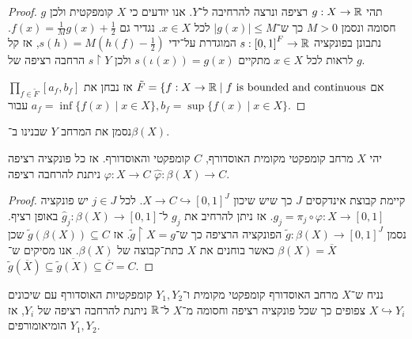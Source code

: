 \begin{proof}
	תהי $g : X \to \mathbb{R}$ רציפה ונרצה להרחיבה ל־$Y$.
	אנו יודעים כי $X$ קומפקטית ולכן $g$ חסומה ונסמן $M > 0$ כך ש־$|g(x)| \le M$ לכל $x \in X$.
	נגדיר גם $f(x) = \frac{1}{M} g(x) + \frac{1}{2}$.
	נתבונן בפונקציה $s : {[0, 1]}^F \to \mathbb{R}$ המוגדרת על־ידי $s(h) = M(h(f) - \frac{1}{2})$, אז קל לראות לכל $x \in X$ מתקיים $s(\iota(x)) = g(x)$ ולכן $s \restriction Y$ הרחבה רציפה של $g$.

	אם $\tilde{F} = \{ f : X \to \mathbb{R} \mid f \text{ is bounded and continuous}$ אז נבחן את $\prod_{f \in \tilde{F}} [a_f, b_f]$ עבור $a_f = \inf\{ f(x) \mid x \in X \}, b_f = \sup\{ f(x) \mid x \in X \}$.
\end{proof}
\begin{notation}
	נסמן את המרחב $Y$ שבנינו ב־$\beta(X)$.
\end{notation}
\begin{theorem}
	יהי $X$ מרחב קומפקטי מקומית האוסדורף, $C$ קומפקטי והאוסדורף.
	אז כל פונקציה רציפה $\varphi : X \to C$ ניתנת להרחבה רציפה $\hat{\varphi} : \beta(X) \to C$.
\end{theorem}
\begin{proof}
	קיימת קבוצת אינדקסים $J$ כך שיש שיכון $X \to C \hookrightarrow {[0, 1]}^J$.
	לכל $j \in J$ יש פונקציה $g_j = \pi_j \circ \varphi : X \to [0, 1]$.
	אז ניתן להרחיב את $g_j$ ל־$\hat{g}_j : \beta(X) \to [0, 1]$ באופן רציף.
	נסמן $\tilde{g} : \beta(X) \to {[0, 1]}^J$ הפונקציה הרציפה כך ש־$\tilde{g} \restriction X = g$.
	אז $\tilde{g}(\beta(X)) \subseteq C$ שכן $\beta(X) = \overline{X}$ כאשר בוחנים את $X$ כתת־קבוצה של $\beta(X)$.
	אנו מסיקים ש־$\tilde{g}(\overline{X}) \subseteq \overline{\tilde{g}(X)} \subseteq \overline{C} = C$.
\end{proof}
\begin{proposition}
	נניח ש־$X$ מרחב האוסדורף קומפקטי מקומית ו־$Y_1, Y_2$ קומפקטיות האוסדורף עם שיכונים $X \hookrightarrow Y_i$ צפופים כך שכל פונקציה רציפה וחסומה מ־$X$ ל־$\mathbb{R}$ ניתנת להרחבה רציפה של $Y_i$,
	אז $Y_1, Y_2$ הומיאומורפים.
\end{proposition}

